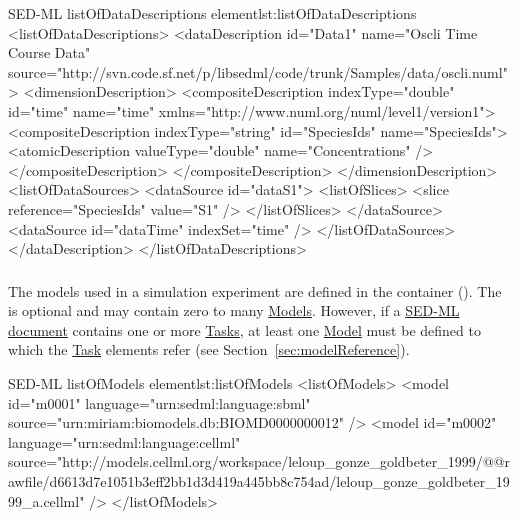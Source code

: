 
\begin{myXmlLst}{SED-ML listOfDataDescriptions element}{lst:listOfDataDescriptions}
<listOfDataDescriptions>
	<dataDescription id="Data1" name="Oscli Time Course Data" source="http://svn.code.sf.net/p/libsedml/code/trunk/Samples/data/oscli.numl">
		<dimensionDescription>
			<compositeDescription indexType="double" id="time" name="time" xmlns="http://www.numl.org/numl/level1/version1">
        			<compositeDescription indexType="string" id="SpeciesIds" name="SpeciesIds">
         			<atomicDescription valueType="double" name="Concentrations" />
          		</compositeDescription>
      		</compositeDescription>
		</dimensionDescription>
		<listOfDataSources>
			<dataSource id="dataS1">
				<listOfSlices>
					<slice reference="SpeciesIds" value="S1" />
				</listOfSlices>
			</dataSource>
			<dataSource id="dataTime" indexSet="time" />
		</listOfDataSources>
	</dataDescription>
</listOfDataDescriptions>
\end{myXmlLst}


\subsubsection{}
\label{sec:listOfModels}
The models used in a simulation experiment are defined in the  container (). The  is optional and may contain zero to many \hyperref[class:model]{Models}. However, if a \hyperref[class:sed-ml]{SED-ML document} contains one or more \hyperref[class:abstractTask]{Tasks}, at least one \hyperref[class:model]{Model} must be defined to which the \hyperref[class:abstractTask]{Task} elements refer (see Section~\ref{sec:modelReference}).


\begin{myXmlLst}{SED-ML listOfModels element}{lst:listOfModels}
<listOfModels>
	<model id="m0001" language="urn:sedml:language:sbml" 
		source="urn:miriam:biomodels.db:BIOMD0000000012" />
	<model id="m0002" language="urn:sedml:language:cellml" 
		source="http://models.cellml.org/workspace/leloup_gonze_goldbeter_1999/@@rawfile/d6613d7e1051b3eff2bb1d3d419a445bb8c754ad/leloup_gonze_goldbeter_1999_a.cellml" />
</listOfModels>
\end{myXmlLst}


